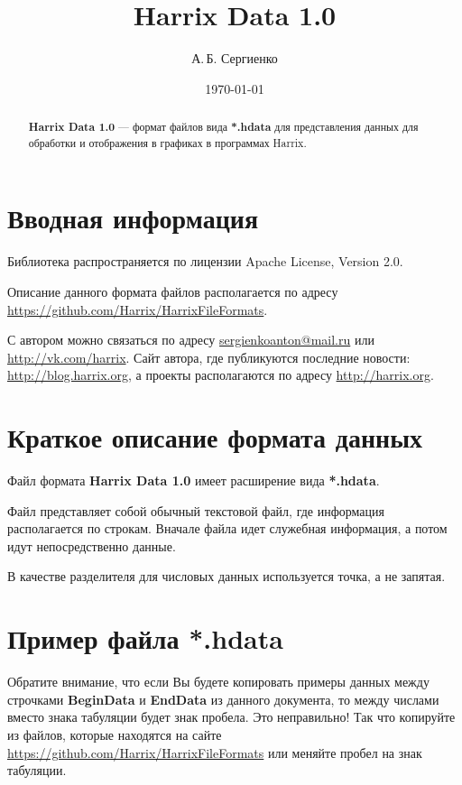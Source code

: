 \documentclass[a4paper,12pt]{article}
\title{Harrix Data 1.0}
\author{А.\,Б. Сергиенко}
\date{\today}
\begin{document}


\maketitle

\begin{abstract}
\textbf{Harrix Data 1.0} --- формат файлов вида \textbf{*.hdata} для представления данных для обработки и отображения в графиках в программах Harrix.
\end{abstract}

\tableofcontents

\newpage

\section{Вводная информация}

Библиотека распространяется по лицензии Apache License, Version 2.0.

Описание данного формата файлов располагается по адресу \href {https://github.com/Harrix/HarrixFileFormats} {https://github.com/Harrix/HarrixFileFormats}.

С автором можно связаться по адресу \href {mailto:sergienkoanton@mail.ru} {sergienkoanton@mail.ru} или  \href {http://vk.com/harrix} {http://vk.com/harrix}. Сайт автора, где публикуются последние новости: \href {http://blog.harrix.org} {http://blog.harrix.org}, а проекты располагаются по адресу \href {http://harrix.org} {http://harrix.org}.


\section{Краткое описание формата данных}

Файл формата \textbf{Harrix Data 1.0} имеет расширение вида \textbf{*.hdata}.

Файл представляет собой обычный текстовой файл, где информация располагается по строкам. Вначале файла идет служебная информация, а потом идут непосредственно данные.

В качестве разделителя для числовых данных используется точка, а не запятая.

\section{Пример файла *.hdata}

Обратите внимание, что если Вы будете копировать примеры данных между строчками \textbf{BeginData} и \textbf{EndData} из данного документа, то между числами вместо знака табуляции будет знак пробела. Это неправильно! Так что копируйте из файлов, которые находятся на сайте \href {https://github.com/Harrix/HarrixFileFormats} {https://github.com/Harrix/HarrixFileFormats} или меняйте пробел на знак табуляции.
\end{document}
